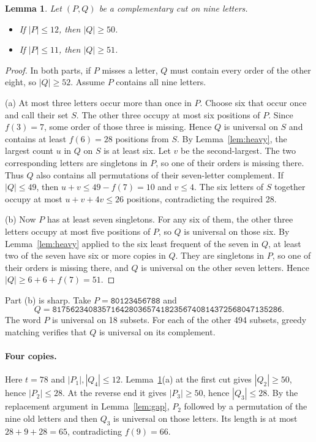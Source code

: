 \documentclass[11pt]{article}
\newtheorem{lemma}[theorem]{Lemma}
\begin{document}
\begin{lemma}\label{lem:short}
Let $(P,Q)$ be a complementary cut on nine letters.
\begin{itemize}
\item[(a)] If $|P|\le12$, then $|Q|\ge50$.
\item[(b)] If $|P|\le11$, then $|Q|\ge51$.
\end{itemize}
\end{lemma}
\begin{proof}
In both parts, if $P$ misses a letter, $Q$ must contain every order of the other eight, so $|Q|\ge52$. Assume $P$ contains all nine letters.

(a) At most three letters occur more than once in $P$. Choose six that occur once and call their set $S$. The other three occupy at most six positions of $P$. Since $f(3)=7$, some order of those three is missing. Hence $Q$ is universal on $S$ and contains at least $f(6)=28$ positions from $S$. By Lemma~\ref{lem:heavy}, the largest count $u$ in $Q$ on $S$ is at least six. Let $v$ be the second-largest. The two corresponding letters are singletons in $P$, so one of their orders is missing there. Thus $Q$ also contains all permutations of their seven-letter complement. If $|Q|\le49$, then $u+v\le49-f(7)=10$ and $v\le4$. The six letters of $S$ together occupy at most $u+v+4v\le26$ positions, contradicting the required 28.

(b) Now $P$ has at least seven singletons. For any six of them, the other three letters occupy at most five positions of $P$, so $Q$ is universal on those six. By Lemma~\ref{lem:heavy} applied to the six least frequent of the seven in $Q$, at least two of the seven have six or more copies in $Q$. They are singletons in $P$, so one of their orders is missing there, and $Q$ is universal on the other seven letters. Hence $|Q|\ge6+6+f(7)=51$.
\end{proof}
Part (b) is sharp. Take $P=\texttt{80123456788}$ and
\[
Q=\texttt{817562340835716428036574182356740814372568047135286}.
\]
The word $P$ is universal on 18 subsets. For each of the other 494 subsets, greedy matching verifies that $Q$ is universal on its complement.

\paragraph{Four copies.}
Here $t=78$ and $|P_1|,|Q_4|\le12$. Lemma~\ref{lem:short}(a) at the first cut gives $|Q_2|\ge50$, hence $|P_2|\le28$. At the reverse end it gives $|P_3|\ge50$, hence $|Q_3|\le28$. By the replacement argument in Lemma~\ref{lem:gap}, $P_2$ followed by a permutation of the nine old letters and then $Q_3$ is universal on those letters. Its length is at most $28+9+28=65$, contradicting $f(9)=66$.
\end{document}
